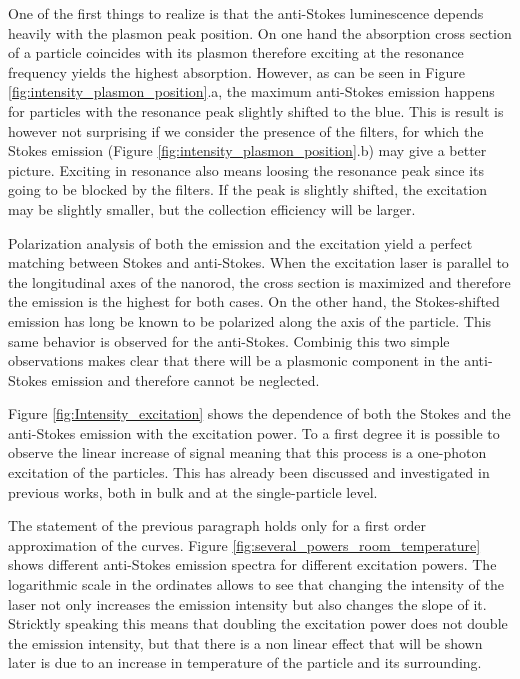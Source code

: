 \documentclass[twocolumn]{article}
\begin{document}
One of the first things to realize is that the anti-Stokes luminescence depends
heavily with the plasmon peak position. On one hand the absorption cross section
of a particle coincides with its plasmon therefore exciting at the resonance
frequency yields the highest absorption. However, as can be seen in Figure
\ref{fig:intensity_plasmon_position}.a, the maximum anti-Stokes emission happens
for particles with the resonance peak slightly shifted to the blue. This is
result is however not surprising if we consider the presence of the filters, for
which the Stokes emission (Figure \ref{fig:intensity_plasmon_position}.b) may
give a better picture. Exciting in resonance also means loosing the
resonance peak since its going to be blocked by the filters. If the peak is
slightly shifted, the excitation may be slightly smaller, but the collection
efficiency will be larger. 

Polarization analysis of both the emission and the excitation yield a perfect
matching between Stokes and anti-Stokes. When the excitation laser is parallel
to the longitudinal axes of the nanorod, the cross section is maximized and
therefore the emission is the highest for both cases. On the other hand, the
Stokes-shifted emission has long be known to be polarized along the axis of the
particle. This same behavior is observed for the anti-Stokes. Combinig this two
simple observations makes clear that there will be a plasmonic component in the
anti-Stokes emission and therefore cannot be neglected. 

Figure \ref{fig:Intensity_excitation} shows the dependence of both the Stokes
and the anti-Stokes emission with the excitation power. To a first degree it is
possible to observe the linear increase of signal meaning that this process is a
one-photon excitation of the particles. This has already been discussed and
investigated in previous works, both in bulk and at the single-particle level. 

The statement of the previous paragraph holds only for a first order
approximation of the curves. Figure \ref{fig:several_powers_room_temperature}
shows different anti-Stokes emission spectra for different excitation powers.
The logarithmic scale in the ordinates allows to see that changing the intensity
of the laser not only increases the emission intensity but also changes the
slope of it. Stricktly speaking this means that doubling the excitation power
does not double the emission intensity, but that there is a non linear effect
that will be shown later is due to an increase in temperature of the particle
and its surrounding. 
\end{document}
